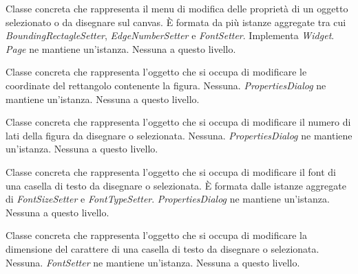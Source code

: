 Classe concreta che rappresenta  il menu di modifica delle propriet\` a di un oggetto selezionato o da disegnare sul canvas.
\` E formata da pi\` u istanze aggregate tra cui \textit{BoundingRectagleSetter}, \textit{EdgeNumberSetter} e \textit{FontSetter}. Implementa \textit{Widget}.
\textit{Page} ne mantiene un'istanza.
Nessuna a questo livello.

Classe concreta che rappresenta l'oggetto che si occupa di modificare le coordinate del rettangolo contenente la figura.
Nessuna.
\textit{PropertiesDialog} ne mantiene un'istanza.
Nessuna a questo livello.

Classe concreta che rappresenta l'oggetto che si occupa di modificare il numero di lati della figura da disegnare o selezionata.
Nessuna.
\textit{PropertiesDialog} ne mantiene un'istanza.
Nessuna a questo livello.

Classe concreta che rappresenta l'oggetto che si occupa di modificare il font di una casella di testo da disegnare o selezionata.
\` E formata dalle istanze aggregate di \textit{FontSizeSetter} e \textit{FontTypeSetter}.
\textit{PropertiesDialog} ne mantiene un'istanza.
Nessuna a questo livello.

Classe concreta che rappresenta l'oggetto che si occupa di modificare la dimensione del carattere di una casella di testo da disegnare o selezionata.
Nessuna.
\textit{FontSetter} ne mantiene un'istanza.
Nessuna a questo livello.

